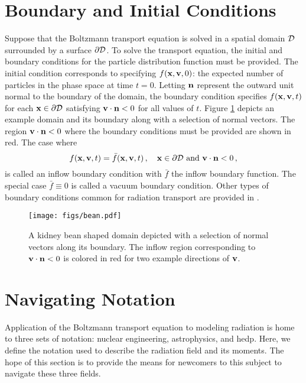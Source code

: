 \documentclass[../doc.tex]{subfiles}
\begin{document}
\section{Boundary and Initial Conditions}
Suppose that the Boltzmann transport equation is solved in a spatial domain $\mathcal{D}$ surrounded by a surface $\partial\mathcal{D}$. To solve the transport equation, the initial and boundary conditions for the particle distribution function must be provided. The initial condition corresponds to specifying $f(\boldsymbol{\mathrm{x}},\boldsymbol{\mathrm{v}},0)$: the expected number of particles in the phase space at time $t=0$. Letting $\boldsymbol{\mathrm{n}}$ represent the outward unit normal to the boundary of the domain, the boundary condition specifies $f(\boldsymbol{\mathrm{x}},\boldsymbol{\mathrm{v}},t)$ for each $\boldsymbol{\mathrm{x}}\in\partial\mathcal{D}$ satisfying $\boldsymbol{\mathrm{v}}\cdot\boldsymbol{\mathrm{n}}<0$ for all values of $t$. Figure \ref{trans:inflow_diag} depicts an example domain and its boundary along with a selection of normal vectors. The region $\boldsymbol{\mathrm{v}}\cdot\boldsymbol{\mathrm{n}}<0$ where the boundary conditions must be provided are shown in red. The case where 
	\begin{equation} \label{trans:gen_inflow}
		f(\x,\v,t) = \bar{f}(\x,\v,t) \,, \quad \x \in \partial\D \ \mathrm{and} \ \v \cdot \n < 0 \,, 
	\end{equation}
is called an inflow boundary condition with $\bar{f}$ the inflow boundary function. The special case $\bar{f} \equiv 0$ is called a vacuum boundary condition. Other types of boundary conditions common for radiation transport are provided in \cite[\S 1.3]{neutron_transport_LM}.
\begin{figure}
\centering
\texttt{[image: figs/bean.pdf]}
\caption{A kidney bean shaped domain depicted with a selection of normal vectors along its boundary. The inflow region corresponding to $\boldsymbol{\mathrm{v}}\cdot\boldsymbol{\mathrm{n}}<0$ is colored in red for two example directions of $\boldsymbol{\mathrm{v}}$.}
\label{trans:inflow_diag}
\end{figure}

\section{Navigating Notation}
Application of the Boltzmann transport equation to modeling radiation is home to three sets of notation: nuclear engineering, astrophysics, and \gls{hedp}. Here, we define the notation used to describe the radiation field and its moments. The hope of this section is to provide the means for newcomers to this subject to navigate these three fields. 
\end{document}
